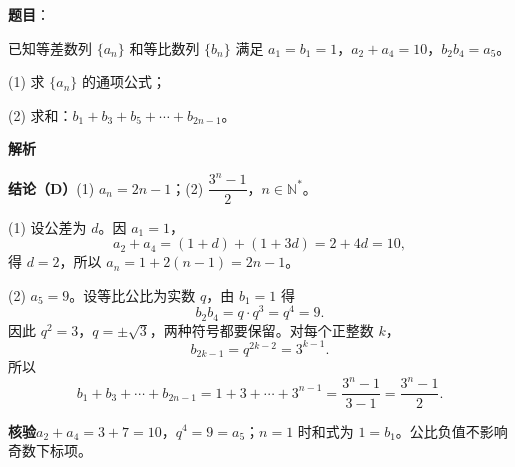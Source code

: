 \begin{answer}

\textbf{题目}：

已知等差数列 $\{a_n\}$ 和等比数列 $\{b_n\}$ 满足 $a_1=b_1=1$，$a_2+a_4=10$，$b_2b_4=a_5$。

(1)   求 $\{a_n\}$ 的通项公式；

(2)   求和：$b_1+b_3+b_5+\cdots+b_{2n-1}$。

\textbf{解析}

\textbf{结论（D）}(1) $a_n=2n-1$；(2) $\dfrac{3^n-1}{2}$，$n\in\mathbb N^*$。

(1) 设公差为 $d$。因 $a_1=1$，
\nopagebreak[4]
\[
a_2+a_4=(1+d)+(1+3d)=2+4d=10,
\]
得 $d=2$，所以 $a_n=1+2(n-1)=2n-1$。

(2) $a_5=9$。设等比公比为实数 $q$，由 $b_1=1$ 得
\nopagebreak[4]
\[
b_2b_4=q\cdot q^3=q^4=9.
\]
因此 $q^2=3$，$q=\pm\sqrt3$，两种符号都要保留。对每个正整数 $k$，
\nopagebreak[4]
\[
b_{2k-1}=q^{2k-2}=3^{k-1}.
\]
所以
\nopagebreak[4]
\[
b_1+b_3+\cdots+b_{2n-1}
=1+3+\cdots+3^{n-1}
=\frac{3^n-1}{3-1}
=\frac{3^n-1}{2}.
\]

\textbf{核验}$a_2+a_4=3+7=10$，$q^4=9=a_5$；$n=1$ 时和式为 $1=b_1$。公比负值不影响奇数下标项。



\end{answer}
